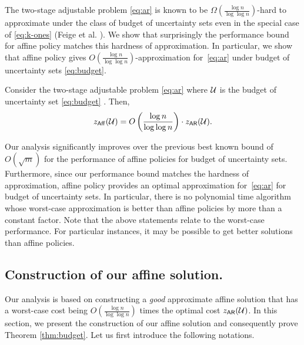 \documentclass[moor]{informs1}              %
\newcommand{\mb}[1]{\ensuremath{\boldsymbol{#1}}}
\begin{document}
The two-stage adjustable problem \eqref{eq:ar} is known to be  $\Omega( \frac{\log n}{\log \log n})$-hard to approximate under the class of budget of uncertainty sets even in the special case of \eqref{eq:k-ones} (Feige et al. \cite{FJMM07}). We show that surprisingly the performance bound for affine policy matches this hardness of approximation.  In particular, we show that affine policy gives $O (\frac{\log n}{\log \log n}) $-approximation for~\eqref{eq:ar} under budget of uncertainty sets \eqref{eq:budget}.

\begin{theorem}\label{thm:budget}
Consider the two-stage adjustable problem \eqref{eq:ar} where $ {\cal U}$ is the budget of uncertainty set \eqref{eq:budget} . Then,
$$ z_{\sf Aff}({\cal U}) = O \left( \frac{\log n}{\log \log n} \right)\cdot z_{\sf AR}({\cal U}).$$
\end{theorem}
Our analysis significantly improves over the previous best known bound of $O(\sqrt m)$ for the performance of affine policies for budget of uncertainty sets. Furthermore, since our performance bound matches the hardness of approximation, affine policy provides an optimal approximation for~\eqref{eq:ar} for budget of uncertainty sets. In particular, there is no polynomial time algorithm whose worst-case approximation is better than affine policies by more than a constant factor. Note that the above statements relate to the worst-case performance. For particular instances, it may be possible to get better solutions than affine policies.

\subsection{Construction of our affine solution.}

Our analysis is based on constructing a {\em good} approximate affine solution that has a worst-case cost being $O \left( \frac{\log n}{\log \log n} \right)$ times the optimal cost $z_{\sf AR}({\cal U})$. In this section, we present the construction of our affine solution and consequently prove Theorem \ref{thm:budget}. Let us first introduce the following notations.
\end{document}
